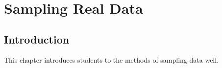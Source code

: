\chapter{Sampling Real Data}

\section{Introduction}
This chapter introduces students to the methods of sampling data well.
